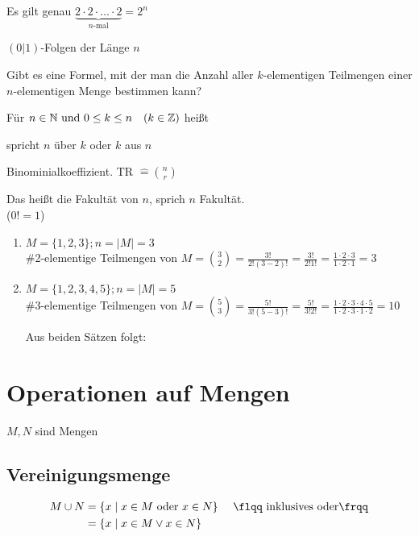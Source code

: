 Es gilt genau $\underbrace{2\cdot 2\cdot \ldots\cdot 2}_\text{$n$-mal}=2^n$

$(0|1)$-Folgen der Länge $n$


\Frage
Gibt es eine Formel, mit der man die Anzahl aller $k$-elementigen Teilmengen einer $n$-elementigen Menge bestimmen kann?

\Def Für $n\in \mathbb{N}\text{ und }0\leq k\leq n \hspace{10pt}(k\in \mathbb{Z})$ heißt

 \qquad spricht {\flqq $n$ über $k$\frqq} oder {\flqq $k$ aus $n$\frqq}

Binominialkoeffizient. \qquad {} TR $\widehat= \binom{n}{r}$

\vspace{1cm}
Das heißt 
die Fakultät von $n$, sprich {\flqq $n$ Fakultät\frqq}.\\
($0!=1$)


\Bsps
\begin{enumerate}
	\item $M=\{1,2,3\}; n=\left|M\right| = 3$\\
	\#2-elementige Teilmengen von $M =\binom{3}{2}=\frac{3!}{2!(3-2)!}=\frac{3!}{2!1!}=\frac{1\cdot 2\cdot 3}{1\cdot 2\cdot 1}=3$
	
	\item $M = \{1,2,3,4,5\}; n=\left|M\right| = 5$\\
	\#3-elementige Teilmengen von $M =\binom{5}{3}=\frac{5!}{3!(5-3)!}=\frac{5!}{3!2!}=\frac{1\cdot 2\cdot 3\cdot 4\cdot 5}{1\cdot 2\cdot 3\cdot 1\cdot 2}=10$
	
	\Bem Aus beiden Sätzen folgt:
\end{enumerate}

\clearpage
\section{Operationen auf Mengen}
$M,N$ sind Mengen

\subsection{Vereinigungsmenge}

\begin{align*}
	M\cup N&=\{x\mid x\in M\text{ oder }x\in N\}&\text{ \hfill {\flqq inklusives oder\frqq}} \\
	&=\{x\mid x\in M \vee x\in N\}&
\end{align*}

